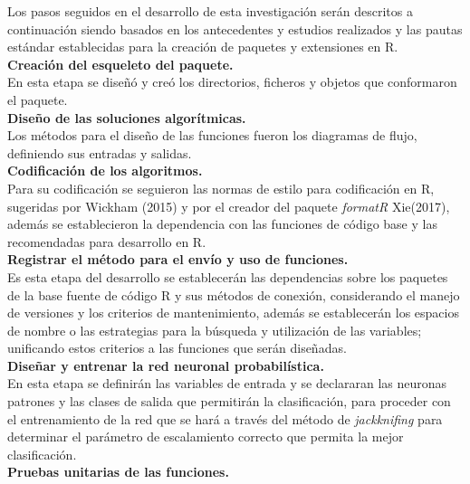 Los pasos seguidos en el desarrollo de esta investigación serán descritos a continuación siendo basados en los antecedentes y estudios realizados y las pautas estándar establecidas para la creación de paquetes y extensiones en R.\\

\noindent
\textbf{Creación del esqueleto del paquete.}\\
En esta etapa se diseñó y creó los directorios, ficheros y objetos que conformaron el paquete.\\

\noindent
\textbf{Diseño de las soluciones algorítmicas.}\\
Los métodos para el diseño de las funciones fueron los diagramas de flujo, definiendo sus entradas y salidas.\\

\noindent
\textbf{Codificación de los algoritmos.}\\
Para su codificación se seguieron las normas de estilo para codificación en R, sugeridas por Wickham (2015) y por el creador del paquete \emph{formatR} Xie(2017), además se establecieron la dependencia con las funciones de código base y las recomendadas para desarrollo en R.\\

\noindent
\textbf{Registrar el método para el envío y uso de funciones.}\\

Es esta etapa del desarrollo se establecerán las dependencias sobre los paquetes de la base fuente de código R y sus métodos de conexión, considerando el manejo de versiones y los criterios de mantenimiento, además  se establecerán  los espacios de nombre o las estrategias para la búsqueda y utilización de las variables; unificando estos criterios a las funciones que serán diseñadas.\\

\noindent
\textbf{Diseñar y entrenar la red neuronal probabilística.}\\

En esta etapa se definirán las variables de entrada y se declararan las neuronas patrones y las clases de salida que permitirán la clasificación, para proceder con el entrenamiento de la red que se hará a través del método de \textit{jackknifing} para determinar el parámetro de escalamiento correcto que permita la mejor clasificación.\\

\noindent
\textbf{Pruebas unitarias de las funciones.}\\

